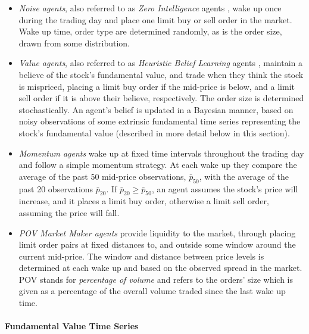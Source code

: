 \documentclass[
    a4paper,
    11pt,
    bibliography=totoc,
    listof=totoc,      
    headinclude=true,
    cleardoublepage=empty,
]{scrbook}
\theoremstyle{plain}
\theoremstyle{definition}
\theoremstyle{remark}
\begin{document}
\begin{itemize}
    \item \textit{Noise agents}, also referred to as \textit{Zero Intelligence}
        agents \cite{byrd2020_athmms}, wake up once during the trading day and
        place one limit buy or sell order in the market. Wake up time, order
        type are determined randomly, as is the order size, drawn from some
        distribution.
        
    \item \textit{Value agents}, also referred to as \textit{Heuristic Belief
        Learning} agents \cite{byrd2020_athmms}, maintain a believe of the
        stock's fundamental value, and trade when they think the stock is
        mispriced, placing a limit buy order if the mid-price is below, and a
        limit sell order if it is above their believe, respectively. The order
        size is determined stochastically. An agent's belief is updated
        in a Bayesian manner, based on noisy observations of some extrinsic
        fundamental time series representing the stock's fundamental value
        (described in more detail below in this section).
    
    \item \textit{Momentum agents} wake up at fixed time intervals throughout
        the trading day and follow a simple momentum strategy. At each wake up
        they compare the average of the past 50 mid-price observations, 
        $\bar{p}_{50}$, with the average of the past 20 observations 
        $\bar{p}_{20}$. If $\bar{p}_{20} \geq \bar{p}_{50}$, an agent assumes
        the stock's price will increase, and it places a limit buy order,
        otherwise a limit sell order, assuming the price will fall.
    
    \item \textit{POV Market Maker agents} provide liquidity to the market,
        through placing limit order pairs at fixed distances to, and outside
        some window around the current mid-price. The window and distance
        between price levels is determined at each wake up and based on the
        observed spread in the market. POV stands for \textit{percentage of
        volume} and refers to the orders' size which is given as a percentage
        of the overall volume traded since the last wake up time.
\end{itemize}

\paragraph{Fundamental Value Time Series}
\label{chapter:Experiments:section:Execution:sub:ABIDES:par:FundamentalValue}
\end{document}
